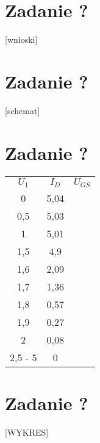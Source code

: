 \documentclass[polish,a4paper]{article}
\begin{document}
\section{Zadanie ?}
[wnioski]


\section{Zadanie ?}
[schemat]

\section{Zadanie ?}


\begin{center}
\begin{tabular}{|c|c|c|}
\hline
\textbf{$U_1 $} & \textbf{$I_D $} & \textbf{$U_{GS}$}\\
\hhline{|=|=|=]}
0 & 5,04 & \\
\hline
0,5 & 5,03 & \\
\hline
1 & 5,01 & \\
\hline
1,5 & 4,9 & \\
\hline
1,6 & 2,09 & \\
\hline
1,7 & 1,36 & \\
\hline
1,8 & 0,57 & \\
\hline
1,9 & 0,27 & \\
\hline
2 & 0,08 & \\
\hline
2,5 - 5 & 0 & \\
\hline

\end{tabular}
\end{center}

\section{Zadanie ?}
[WYKRES]
\end{document}
